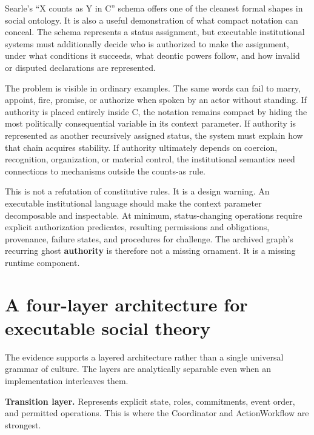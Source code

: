 \documentclass[11pt]{article}
\begin{document}
Searle's “X counts as Y in C” schema offers one of the cleanest formal shapes in social ontology. It is also a useful demonstration of what compact notation can conceal. The schema represents a status assignment, but executable institutional systems must additionally decide who is authorized to make the assignment, under what conditions it succeeds, what deontic powers follow, and how invalid or disputed declarations are represented. \cite{searle2018constitutive}\par

The problem is visible in ordinary examples. The same words can fail to marry, appoint, fire, promise, or authorize when spoken by an actor without standing. If authority is placed entirely inside C, the notation remains compact by hiding the most politically consequential variable in its context parameter. If authority is represented as another recursively assigned status, the system must explain how that chain acquires stability. If authority ultimately depends on coercion, recognition, organization, or material control, the institutional semantics need connections to mechanisms outside the counts-as rule.\par

This is not a refutation of constitutive rules. It is a design warning. An executable institutional language should make the context parameter decomposable and inspectable. At minimum, status-changing operations require explicit authorization predicates, resulting permissions and obligations, provenance, failure states, and procedures for challenge. The archived graph's recurring ghost \textbf{authority} is therefore not a missing ornament. It is a missing runtime component.\par

\section{A four-layer architecture for executable social theory}

The evidence supports a layered architecture rather than a single universal grammar of culture. The layers are analytically separable even when an implementation interleaves them.\par

\textbf{Transition layer.} Represents explicit state, roles, commitments, event order, and permitted operations. This is where the Coordinator and ActionWorkflow are strongest.\par
\end{document}

